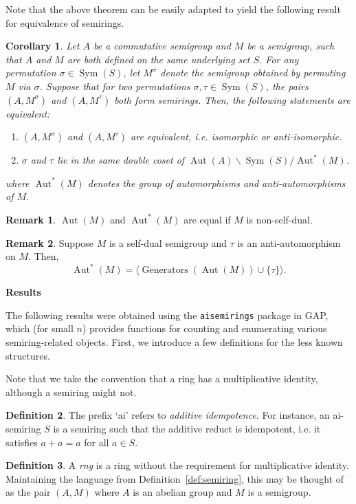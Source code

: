 \documentclass{article}
\theoremstyle{definition}
\newtheorem{defn}{Definition}[section]
\newtheorem{remark}{Remark}
\theoremstyle{plain}
\newtheorem{cor}[defn]{Corollary}
\begin{document}
Note that the above theorem can be easily adapted to yield the
following result for equivalence of semirings.
\begin{cor}
  \label{cor:equiv-condition}
  Let \(A\) be a commutative semigroup and \(M\) be a semigroup, such
  that \(A\) and \(M\) are both defined on the same underlying set
  \(S\). For any permutation \(\sigma \in \operatorname{Sym}(S)\),
  let \(M^\sigma\) denote the semigroup obtained by permuting \(M\)
  via \(\sigma\). Suppose that for two permutations \(\sigma,
  \tau\in\operatorname{Sym}(S)\), the pairs \((A,M^\sigma)\) and
  \((A,M^\tau)\) both form semirings. Then, the following statements
  are equivalent:
  \begin{enumerate}
    \item \((A, M^\sigma)\) and \((A, M^\tau)\) are equivalent, i.e.
      isomorphic or anti-isomorphic.
    \item \(\sigma\) and \(\tau\) lie in the same double coset of
      \(\operatorname{Aut}(A) \backslash \operatorname{Sym}(S) /
      \operatorname{Aut}^*(M)\).
  \end{enumerate}
  where \(\operatorname{Aut}^*(M)\) denotes the group of
  automorphisms and anti-automorphisms of \(M\).
\end{cor}

\begin{remark}
  \(\operatorname{Aut}(M)\) and \(\operatorname{Aut}^*(M)\) are equal
  if \(M\) is non-self-dual.
\end{remark}

\begin{remark}
  Suppose \(M\) is a self-dual semigroup and \(\tau\) is an
  anti-automorphism on \(M\). Then,
  \[\operatorname{Aut}^*(M) =
    \langle\operatorname{Generators}(\operatorname{Aut}(M)) \cup
  \{\tau\}\rangle.\]
\end{remark}
\vspace{3em}
\begin{center}
  \textbf{Results}
\end{center}
The following results were obtained using the \texttt{aisemirings}
package in GAP, which (for small \(n\)) provides functions for
counting and enumerating various semiring-related objects. First, we
introduce a few definitions for the less known structures.

Note that we take the convention that a ring has a multiplicative
identity, although a semiring might not.

\begin{defn}
  The prefix `ai' refers to \emph{additive idempotence}. For
  instance, an ai-semiring \(S\) is a semiring such that the additive
  reduct is idempotent, i.e. it satisfies \(a + a = a\) for all \(a\in S\).
\end{defn}
\begin{defn}
  A \emph{rng} is a ring without the requirement for multiplicative
  identity. Maintaining the language from
  Definition~\ref{def:semiring}, this may be thought of as the pair
  \((A, M)\) where \(A\) is an abelian group and \(M\) is a semigroup.
\end{defn}
\end{document}
